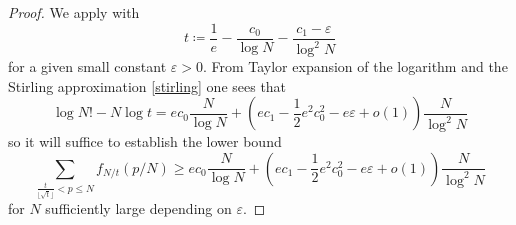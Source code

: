 \documentclass[12pt,a4paper,reqno]{amsart}
\numberwithin{equation}{section}
\theoremstyle{plain}
\theoremstyle{definition}
\newcommand\eps{\varepsilon}
\begin{document}
    \begin{proof}  We apply  with
      $$ t \coloneqq \frac{1}{e} - \frac{c_0}{\log N} - \frac{c_1-\eps}{\log^2 N}$$
    for a given small constant $\eps>0$.  From Taylor expansion of the logarithm and the Stirling approximation \eqref{stirling} one sees that
    $$ \log N! - N \log t = ec_0 \frac{N}{\log N} + (ec_1 - \frac{1}{2} e^2 c_0^2 - e\eps+o(1)) \frac{N}{\log^2 N}$$
    so it will suffice to establish the lower bound
    \begin{equation}\label{targ-sum}
      \sum_{\frac{t}{\lfloor\sqrt{t}\rfloor} < p \leq N} f_{N/t}(p/N) \geq ec_0 \frac{N}{\log N} + (ec_1 - \frac{1}{2} e^2 c_0^2 - e \eps + o(1)) \frac{N}{\log^2 N}
    \end{equation}
    for $N$ sufficiently large depending on $\eps$.


\end{proof}
\end{document}
